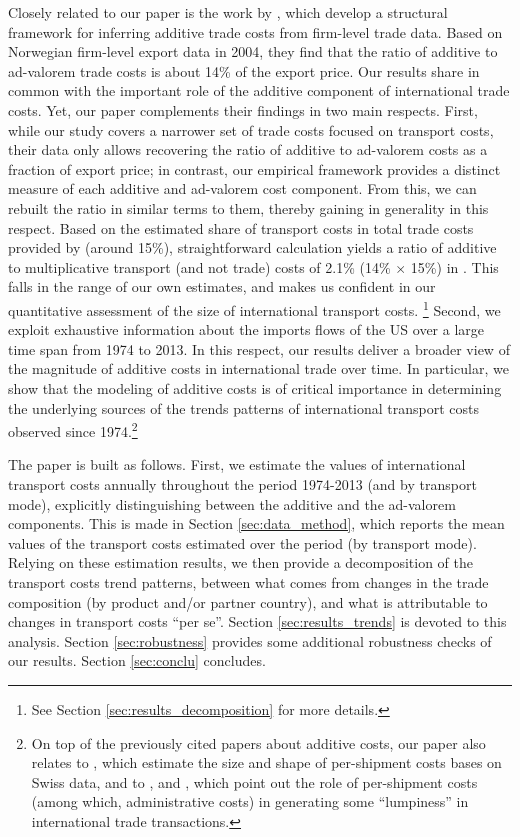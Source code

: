 \documentclass[a4paper,11pt]{article}
\begin{document}
Closely related to our paper is the work by \citet{Irrazabal_2015}, which develop a structural framework for inferring additive trade costs from firm-level trade data. Based on Norwegian firm-level export data in 2004, they find that the ratio of additive to ad-valorem trade costs is about 14\% of the export price. Our results share in common with \citet{Irrazabal_2015} the important role of the additive component of international trade costs. Yet, our paper complements their findings in two main respects. First, while our study covers a narrower set of trade costs focused on transport costs, their data only allows recovering the ratio of additive to ad-valorem costs as a fraction of export price; in contrast, our empirical framework provides a distinct measure of each additive and ad-valorem cost component. From this, we can rebuilt the ratio in similar terms to them, thereby gaining in generality in this respect. Based on the estimated share of transport costs in total trade costs provided by \citet{anderson_wincoop_jel} (around 15\%), straightforward calculation yields a ratio of additive to multiplicative transport (and not trade) costs of 2.1\% (14\% $\times$ 15\%) in \citet{Irrazabal_2015}. This falls in the range of our own estimates, and makes us confident in our quantitative assessment of the size of international transport costs. \footnote{See Section \ref{sec:results_decomposition} for more details.} Second, we exploit exhaustive information about the imports flows of the US over a large time span from 1974 to 2013. In this respect, our results deliver a broader view of the magnitude of additive costs in international trade over time. In particular, we show that the modeling of additive costs is of critical importance in determining the underlying sources of the trends patterns of international transport costs observed since 1974.\footnote{On top of the previously cited papers about additive costs, our paper also relates to \citet{Kropf-Saure-JIE-2016}, which estimate the size and shape of per-shipment costs bases on Swiss data, and to \citet{Alessandria-et-al-AER-2010}, \citet{Hornok-et-al-RES-2015} and \citet{Hornok-et-al-JIE-2015}, which point out the role of per-shipment costs (among which, administrative costs) in generating some ``lumpiness'' in international trade transactions.} \smallskip

The paper is built as follows. First, we estimate the values of international transport costs annually throughout the period 1974-2013 (and by transport mode), explicitly distinguishing between the additive and the ad-valorem components. This is made in Section \ref{sec:data_method}, which reports the mean values of the transport costs estimated over the period (by transport mode). Relying on these estimation results, we then provide a decomposition of the transport costs trend patterns, between what comes from changes in the trade composition (by product and/or partner country), and what is attributable to changes in transport costs ``per se''. Section \ref{sec:results_trends} is devoted to this analysis. Section \ref{sec:robustness} provides some additional robustness checks of our results. Section \ref{sec:conclu} concludes.
\end{document}
